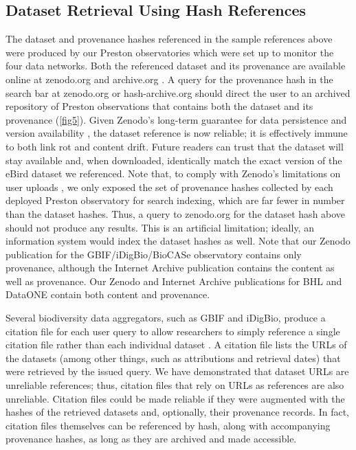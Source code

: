 \subsection*{Dataset Retrieval Using Hash References}

The dataset and provenance hashes referenced in the sample references above were produced by our Preston observatories which were set up to monitor the four data networks. Both the referenced dataset and its provenance are available online at zenodo.org \citep{poelen_jorrit_h_2019_3483218, poelen_jorrit_h_2019_3484555, poelen_jorrit_h_2019_3484205} and archive.org \citep{poelen_jorrit_h_2019_archive_org}. A query for the provenance hash in the search bar at zenodo.org or hash-archive.org should direct the user to an archived repository of Preston observations that contains both the dataset and its provenance (\ref{fig5}). Given Zenodo’s long-term guarantee for data persistence and version availability \citep{zenodo_2019}, the dataset reference is now reliable; it is effectively immune to both link rot and content drift. Future readers can trust that the dataset will stay available and, when downloaded, identically match the exact version of the eBird dataset we referenced. Note that, to comply with Zenodo’s limitations on user uploads \citep{zenodo_2019}, we only exposed the set of provenance hashes collected by each deployed Preston observatory for search indexing, which are far fewer in number than the dataset hashes. Thus, a query to zenodo.org for the dataset hash above should not produce any results. This is an artificial limitation; ideally, an information system would index the dataset hashes as well. Note that our Zenodo publication for the GBIF/iDigBio/BioCASe observatory \citep{poelen_jorrit_h_2019_3484205} contains only provenance, although the Internet Archive publication \citep{poelen_jorrit_h_2019_archive_org} contains the content as well as provenance. Our Zenodo and Internet Archive publications for BHL \citep{poelen_jorrit_h_2019_3484555, poelen_jorrit_h_2019_archive_org_bhl} and DataONE \citep{poelen_jorrit_h_2019_3483218,poelen_jorrit_h_2019_archive_org_dataone} contain both content and provenance.

Several biodiversity data aggregators, such as GBIF and iDigBio, produce a citation file for each user query to allow researchers to simply reference a single citation file rather than each individual dataset \citep{gbif_2019,idigbio_2016}. A citation file lists the URLs of the datasets (among other things, such as attributions and retrieval dates) that were retrieved by the issued query. We have demonstrated that dataset URLs are unreliable references; thus, citation files that rely on URLs as references are also unreliable. Citation files could be made reliable if they were augmented with the hashes of the retrieved datasets and, optionally, their provenance records. In fact, citation files themselves can be referenced by hash, along with accompanying provenance hashes, as long as they are archived and made accessible.

